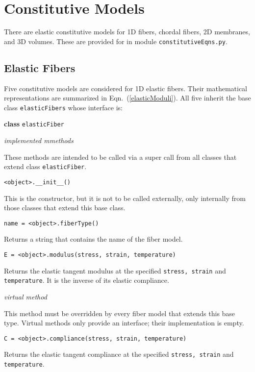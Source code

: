\section{Constitutive Models}
\label{appModels}

There are elastic constitutive models for 1D fibers, chordal fibers, 2D membranes, and 3D volumes.  These are provided for in module \texttt{constitutiveEqns.py}.

\subsection{Elastic Fibers}
\label{appElasticFibers}

Five constitutive models are considered for 1D elastic fibers.  Their mathematical representations are summarized in Eqn.~(\ref{elasticModuli}).  All five inherit the base class \texttt{elasticFibers} whose interface is:

\medskip\noindent
\textbf{class} \texttt{elasticFiber}

\bigskip\noindent
\textit{implemented mmethods}

\bigskip\noindent
These methods are intended to be called via a super call from all classes that extend class \texttt{elasticFiber}.  

\bigskip\noindent
\texttt{<object>.\_\_init\_\_()}
    
\medskip\noindent
This is the constructor, but it is not to be called externally, only internally from those classes that extend this base class.

\bigskip\noindent
\texttt{name = <object>.fiberType()}

\medskip\noindent
Returns a string that contains the name of the fiber model.

\medskip\noindent
\texttt{E = <object>.modulus(stress, strain, temperature)}

\medskip\noindent
Returns the elastic tangent modulus at the specified \texttt{stress, strain} and \texttt{temperature}.  It is the inverse of its elastic compliance.

\bigskip\noindent
\textit{virtual method}

\bigskip\noindent
This method must be overridden by every fiber model that extends this base type.  Virtual methods only provide an interface; their implementation is empty. 

\medskip\noindent
\texttt{C = <object>.compliance(stress, strain, temperature)}

\medskip\noindent
Returns the elastic tangent compliance at the specified \texttt{stress, strain} and \texttt{temperature}.


